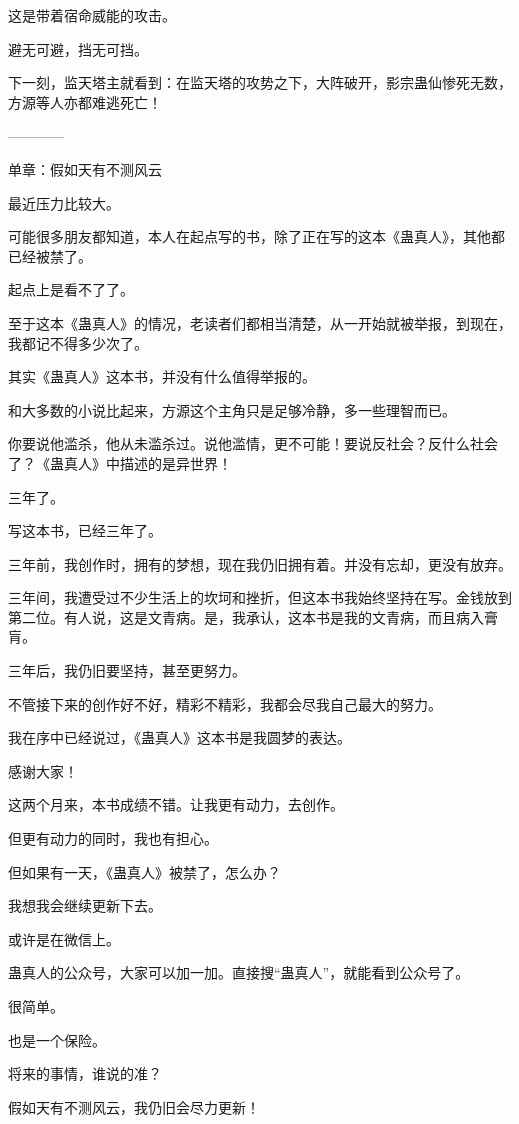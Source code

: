 \begin{this_body}
这是带着宿命威能的攻击。

避无可避，挡无可挡。

下一刻，监天塔主就看到：在监天塔的攻势之下，大阵破开，影宗蛊仙惨死无数，方源等人亦都难逃死亡！

------------

单章：假如天有不测风云

最近压力比较大。

可能很多朋友都知道，本人在起点写的书，除了正在写的这本《蛊真人》，其他都已经被禁了。

起点上是看不了了。

至于这本《蛊真人》的情况，老读者们都相当清楚，从一开始就被举报，到现在，我都记不得多少次了。

其实《蛊真人》这本书，并没有什么值得举报的。

和大多数的小说比起来，方源这个主角只是足够冷静，多一些理智而已。

你要说他滥杀，他从未滥杀过。说他滥情，更不可能！要说反社会？反什么社会了？《蛊真人》中描述的是异世界！

三年了。

写这本书，已经三年了。

三年前，我创作时，拥有的梦想，现在我仍旧拥有着。并没有忘却，更没有放弃。

三年间，我遭受过不少生活上的坎坷和挫折，但这本书我始终坚持在写。金钱放到第二位。有人说，这是文青病。是，我承认，这本书是我的文青病，而且病入膏肓。

三年后，我仍旧要坚持，甚至更努力。

不管接下来的创作好不好，精彩不精彩，我都会尽我自己最大的努力。

我在序中已经说过，《蛊真人》这本书是我圆梦的表达。

感谢大家！

这两个月来，本书成绩不错。让我更有动力，去创作。

但更有动力的同时，我也有担心。

但如果有一天，《蛊真人》被禁了，怎么办？

我想我会继续更新下去。

或许是在微信上。

蛊真人的公众号，大家可以加一加。直接搜“蛊真人”，就能看到公众号了。

很简单。

也是一个保险。

将来的事情，谁说的准？

假如天有不测风云，我仍旧会尽力更新！

\end{this_body}

